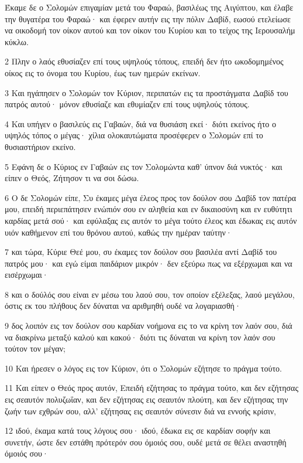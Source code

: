 \par Έκαμε δε ο Σολομών επιγαμίαν μετά του Φαραώ, βασιλέως της Αιγύπτου, και έλαβε την θυγατέρα του Φαραώ· και έφερεν αυτήν εις την πόλιν Δαβίδ, εωσού ετελείωσε να οικοδομή τον οίκον αυτού και τον οίκον του Κυρίου και το τείχος της Ιερουσαλήμ κύκλω.
\par 2 Πλην ο λαός εθυσίαζεν επί τους υψηλούς τόπους, επειδή δεν ήτο ωκοδομημένος οίκος εις το όνομα του Κυρίου, έως των ημερών εκείνων.
\par 3 Και ηγάπησεν ο Σολομών τον Κύριον, περιπατών εις τα προστάγματα Δαβίδ του πατρός αυτού· μόνον εθυσίαζε και εθυμίαζεν επί τους υψηλούς τόπους.
\par 4 Και υπήγεν ο βασιλεύς εις Γαβαών, διά να θυσιάση εκεί· διότι εκείνος ήτο ο υψηλός τόπος ο μέγας· χίλια ολοκαυτώματα προσέφερεν ο Σολομών επί το θυσιαστήριον εκείνο.
\par 5 Εφάνη δε ο Κύριος εν Γαβαών εις τον Σολομώντα καθ' ύπνον διά νυκτός· και είπεν ο Θεός, Ζήτησον τι να σοι δώσω.
\par 6 Ο δε Σολομών είπε, Συ έκαμες μέγα έλεος προς τον δούλον σου Δαβίδ τον πατέρα μου, επειδή περιεπάτησεν ενώπιόν σου εν αληθεία και εν δικαιοσύνη και εν ευθύτητι καρδίας μετά σού· και εφύλαξας εις αυτόν το μέγα τούτο έλεος και έδωκας εις αυτόν υιόν καθήμενον επί του θρόνου αυτού, καθώς την ημέραν ταύτην·
\par 7 και τώρα, Κύριε Θεέ μου, συ έκαμες τον δούλον σου βασιλέα αντί Δαβίδ του πατρός μου· και εγώ είμαι παιδάριον μικρόν· δεν εξεύρω πως να εξέρχωμαι και να εισέρχωμαι·
\par 8 και ο δούλός σου είναι εν μέσω του λαού σου, τον οποίον εξέλεξας, λαού μεγάλου, όστις εκ του πλήθους δεν δύναται να αριθμηθή ουδέ να λογαριασθή·
\par 9 δος λοιπόν εις τον δούλον σου καρδίαν νοήμονα εις το να κρίνη τον λαόν σου, διά να διακρίνω μεταξύ καλού και κακού· διότι τις δύναται να κρίνη τον λαόν σου τούτον τον μέγαν;
\par 10 Και ήρεσεν ο λόγος εις τον Κύριον, ότι ο Σολομών εζήτησε το πράγμα τούτο.
\par 11 Και είπεν ο Θεός προς αυτόν, Επειδή εζήτησας το πράγμα τούτο, και δεν εζήτησας εις σεαυτόν πολυζωΐαν, και δεν εζήτησας εις σεαυτόν πλούτη, και δεν εζήτησας την ζωήν των εχθρών σου, αλλ' εζήτησας εις σεαυτόν σύνεσιν διά να εννοής κρίσιν,
\par 12 ιδού, έκαμα κατά τους λόγους σου· ιδού, έδωκα εις σε καρδίαν σοφήν και συνετήν, ώστε δεν εστάθη πρότερόν σου όμοιός σου, ουδέ μετά σε θέλει αναστηθή όμοιός σου·
